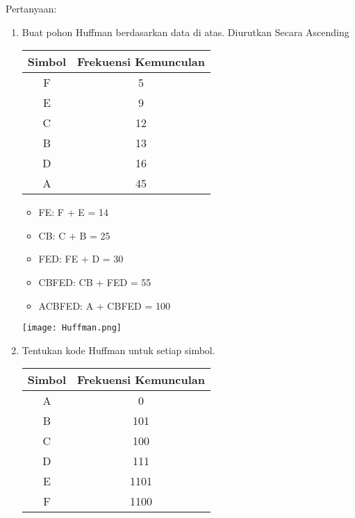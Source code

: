 \documentclass[12pt,a4paper]{article}
\begin{document}
\begin{enumerate}
    Pertanyaan:
    \begin{enumerate}
      \item Buat pohon Huffman berdasarkan data di atas.
        Diurutkan Secara Ascending
        \begin{center}
          \begin{adjustbox}{scale=1,center}
            \begin{tabular}{ |c|c| } 
              \hline
              Simbol & Frekuensi Kemunculan \\ \hline
              F & 5  \\ \hline
              E & 9  \\ \hline
              C & 12 \\ \hline
              B & 13 \\ \hline
              D & 16 \\ \hline
              A & 45 \\ \hline
            \end{tabular}
          \end{adjustbox}
        \end{center}
        \begin{itemize}
          \item FE: F + E = 14
          \item CB: C + B = 25
          \item FED: FE + D = 30
          \item CBFED: CB + FED = 55
          \item ACBFED: A + CBFED = 100
        \end{itemize}

        \begin{center}
        \texttt{[image: Huffman.png]}
        \end{center}

      \item Tentukan kode Huffman untuk setiap simbol.
        \begin{center}
          \begin{adjustbox}{scale=1,center}
            \begin{tabular}{ |c|c| } 
              \hline
              Simbol & Frekuensi Kemunculan \\ \hline
              A & 0  \\ \hline
              B & 101  \\ \hline
              C & 100 \\ \hline
              D & 111 \\ \hline
              E & 1101 \\ \hline
              F & 1100 \\ \hline
            \end{tabular}
          \end{adjustbox}
        \end{center}


\end{enumerate}
\end{enumerate}
\end{document}
